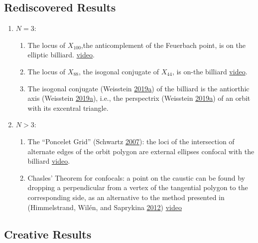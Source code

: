 \documentclass[]{article}
\providecommand{\tightlist}{%
  \setlength{\itemsep}{0pt}\setlength{\parskip}{0pt}}
\begin{document}
\hypertarget{rediscovered-results}{%
\subsection{Rediscovered Results}\label{rediscovered-results}}

\begin{enumerate}
\def\labelenumi{\arabic{enumi}.}
\tightlist
\item
  \(N=3\):

  \begin{enumerate}
  \def\labelenumii{\arabic{enumii}.}
  \tightlist
  \item
    The locus of \(X_{100}\),the anticomplement of the Feuerbach point, is on the elliptic billiard. \href{https://youtu.be/8JKevLpteQk}{video}.
  \item
    The locus of \(X_{88}\), the isogonal conjugate of \(X_{44}\), is on-the billiard \href{https://www.youtube.com/watch?v=vyHZ8fwyiE8}{video}.
  \item
    The isogonal conjugate (Weisstein \protect\hyperlink{ref-mw}{2019}\protect\hyperlink{ref-mw}{a}) of the billiard is the antiorthic axis (Weisstein \protect\hyperlink{ref-mw}{2019}\protect\hyperlink{ref-mw}{a}), i.e., the perspectrix (Weisstein \protect\hyperlink{ref-mw}{2019}\protect\hyperlink{ref-mw}{a}) of an orbit with its excentral triangle.
  \end{enumerate}
\item
  \(N>3\):

  \begin{enumerate}
  \def\labelenumii{\arabic{enumii}.}
  \tightlist
  \item
    The ``Poncelet Grid'' (Schwartz \protect\hyperlink{ref-schwartz07}{2007}): the loci of the intersection of alternate edges of the orbit polygon are external ellipses confocal with the billiard \href{https://www.youtube.com/watch?v=xgdgx0erM58\&list=PLTgIq68k2wHE1gJSCYmFjG05EsEDwXiCR}{video}.
  \item
    Chasles' Theorem for confocals: a point on the caustic can be found by dropping a perpendicular from a vertex of the tangential polygon to the corresponding side, as an alternative to the method presented in (Himmelstrand, Wilén, and Saprykina \protect\hyperlink{ref-himmelstrand12}{2012}) \href{https://www.youtube.com/watch?v=PRkhrUNTXd8}{video}
  \end{enumerate}
\end{enumerate}

\hypertarget{creative-results}{%
\subsection{Creative Results}\label{creative-results}}
\end{document}
